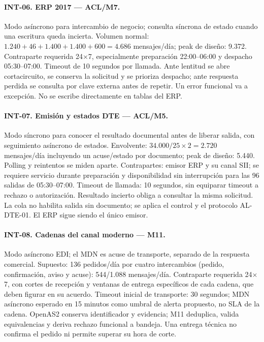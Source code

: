 \paragraph{INT-06. ERP 2017 --- ACL/M7.}
Modo asíncrono para intercambio de negocio; consulta síncrona de estado cuando una escritura queda incierta. Volumen normal: $1.240+46+1.400+1.400+600=4.686$ mensajes/día; peak de diseño: 9.372. Contraparte requerida 24$\times$7, especialmente preparación 22:00--06:00 y despacho 05:30--07:00. Timeout de 10 segundos por llamada. Ante lentitud se abre cortacircuito, se conserva la solicitud y se prioriza despacho; ante respuesta perdida se consulta por clave externa antes de repetir. Un error funcional va a excepción. No se escribe directamente en tablas del ERP.

\paragraph{INT-07. Emisión y estados DTE --- ACL/M5.}
Modo síncrono para conocer el resultado documental antes de liberar salida, con seguimiento asíncrono de estados. Envolvente: $34.000/25\times2=2.720$ mensajes/día incluyendo un acuse/estado por documento; peak de diseño: 5.440. Polling y reintentos se miden aparte. Contrapartes: emisor ERP y su canal SII; se requiere servicio durante preparación y disponibilidad sin interrupción para las 96 salidas de 05:30--07:00. Timeout de llamada: 10 segundos, sin equiparar timeout a rechazo o autorización. Resultado incierto obliga a consultar la misma solicitud. La cola no habilita salida sin documento; se aplica el control y el protocolo AL-DTE-01. El ERP sigue siendo el único emisor.

\paragraph{INT-08. Cadenas del canal moderno --- M11.}
Modo asíncrono EDI; el MDN es acuse de transporte, separado de la respuesta comercial. Supuesto: 136 pedidos/día por cuatro intercambios (pedido, confirmación, aviso y acuse): 544/1.088 mensajes/día. Contraparte requerida 24$\times$7, con cortes de recepción y ventanas de entrega específicos de cada cadena, que deben figurar en su acuerdo. Timeout inicial de transporte: 30 segundos; MDN asíncrono esperado en 15 minutos como umbral de alerta propuesto, no SLA de la cadena. OpenAS2 conserva identificador y evidencia; M11 deduplica, valida equivalencias y deriva rechazo funcional a bandeja. Una entrega técnica no confirma el pedido ni permite superar su hora de corte.

